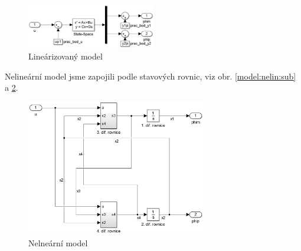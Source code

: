 \documentclass[11pt,a4paper]{article}
\begin{document}
\begin{figure}[H]
\centering
\includegraphics[width=0.5\textwidth]{schema_linearizovany.jpg}
\caption{Lineárizovaný model}
\label{model:lin}
\end{figure}

Nelineární model jsme zapojili podle stavových rovnic, viz obr. \ref{model:nelin:sub} a \ref{model:nelin:celk}.

\begin{figure}[H]
\centering
\includegraphics[width=0.7\textwidth]{schema_nelinearni_celek.jpg}
\caption{Nelneární model}
\label{model:nelin:celk}
\end{figure}
\end{document}
